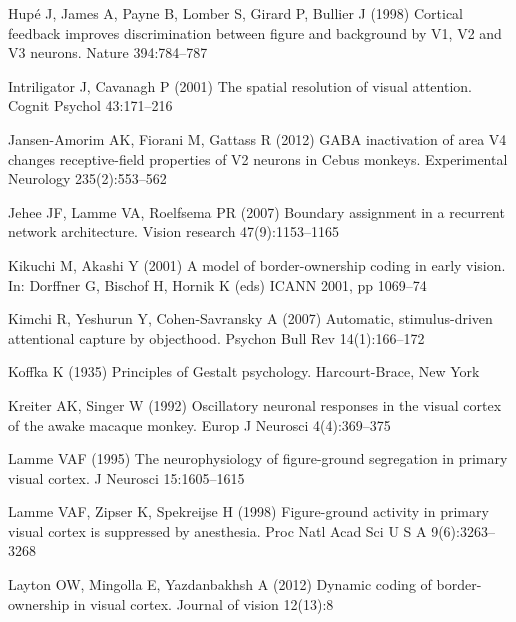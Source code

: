 \begin{thebibliography}{90}
Hup\'{e} J, James A, Payne B, Lomber S, Girard P, Bullier J (1998) {C}ortical
  feedback improves discrimination between figure and background by {V}1, {V}2
  and {V}3 neurons. Nature 394:784--787

Intriligator J, Cavanagh P (2001) {T}he spatial resolution of visual attention.
  Cognit Psychol 43:171--216

Jansen-Amorim AK, Fiorani M, Gattass R (2012) {GABA} inactivation of area {V}4
  changes receptive-field properties of {V}2 neurons in {C}ebus monkeys.
  Experimental {N}eurology 235(2):553--562

Jehee JF, Lamme VA, Roelfsema PR (2007) Boundary assignment in a recurrent
  network architecture. Vision research 47(9):1153--1165

Kikuchi M, Akashi Y (2001) {A} model of border-ownership coding in early
  vision. In: Dorffner G, Bischof H, Hornik K (eds) ICANN 2001, pp 1069--74

Kimchi R, Yeshurun Y, Cohen-Savransky A (2007) {A}utomatic, stimulus-driven
  attentional capture by objecthood. Psychon Bull Rev 14(1):166--172

Koffka K (1935) {P}rinciples of {G}estalt psychology. Harcourt-Brace, New York

Kreiter AK, Singer W (1992) {O}scillatory neuronal responses in the visual
  cortex of the awake macaque monkey. Europ J Neurosci 4(4):369--375

Lamme VAF (1995) {T}he neurophysiology of figure-ground segregation in primary
  visual cortex. J Neurosci 15:1605--1615

Lamme VAF, Zipser K, Spekreijse H (1998) {F}igure-ground activity in primary
  visual cortex is suppressed by anesthesia. Proc Natl Acad Sci U S A
  9(6):3263--3268

Layton OW, Mingolla E, Yazdanbakhsh A (2012) {D}ynamic coding of
  border-ownership in visual cortex. Journal of vision 12(13):8


\end{thebibliography}
